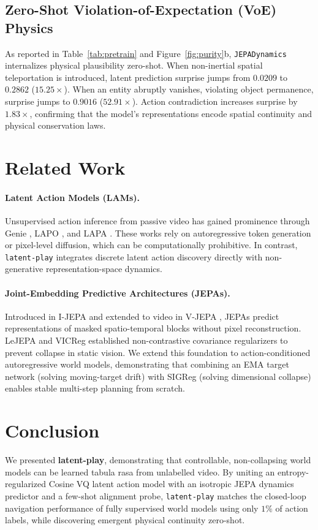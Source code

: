 \documentclass[11pt,letterpaper]{article}
\begin{document}
\subsection{Zero-Shot Violation-of-Expectation (VoE) Physics}
As reported in Table~\ref{tab:pretrain} and Figure~\ref{fig:purity}b, \texttt{JEPADynamics} internalizes physical plausibility zero-shot. When non-inertial spatial teleportation is introduced, latent prediction surprise jumps from $0.0209$ to $0.2862$ ($\mathbf{15.25\times}$). When an entity abruptly vanishes, violating object permanence, surprise jumps to $0.9016$ ($\mathbf{52.91\times}$). Action contradiction increases surprise by $1.83\times$, confirming that the model's representations encode spatial continuity and physical conservation laws.

\section{Related Work}
\paragraph{Latent Action Models (LAMs).}
Unsupervised action inference from passive video has gained prominence through Genie \cite{bruce2024genie}, LAPO \cite{schmidt2023lapo}, and LAPA \cite{ye2025lapa}. These works rely on autoregressive token generation or pixel-level diffusion, which can be computationally prohibitive. In contrast, \texttt{latent-play} integrates discrete latent action discovery directly with non-generative representation-space dynamics.

\paragraph{Joint-Embedding Predictive Architectures (JEPAs).}
Introduced in I-JEPA \cite{assran2023ijepa} and extended to video in V-JEPA \cite{assran2025vjepa2}, JEPAs predict representations of masked spatio-temporal blocks without pixel reconstruction. LeJEPA \cite{balestriero2025lejepa} and VICReg \cite{bardes2022vicreg} established non-contrastive covariance regularizers to prevent collapse in static vision. We extend this foundation to action-conditioned autoregressive world models, demonstrating that combining an EMA target network (solving moving-target drift) with SIGReg (solving dimensional collapse) enables stable multi-step planning from scratch.

\section{Conclusion}
We presented \textbf{latent-play}, demonstrating that controllable, non-collapsing world models can be learned tabula rasa from unlabelled video. By uniting an entropy-regularized Cosine VQ latent action model with an isotropic JEPA dynamics predictor and a few-shot alignment probe, \texttt{latent-play} matches the closed-loop navigation performance of fully supervised world models using only $1\%$ of action labels, while discovering emergent physical continuity zero-shot.
\end{document}
